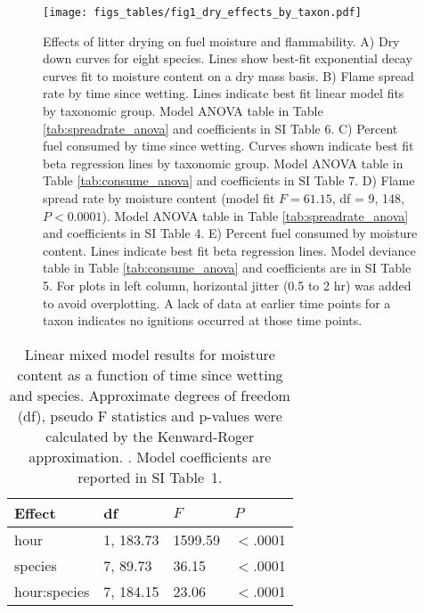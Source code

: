 \documentclass[letterpaper,12pt]{article}
\begin{document}
\begin{figure}
  \centering
  \texttt{[image: figs\_tables/fig1\_dry\_effects\_by\_taxon.pdf]}
  \caption{}
\end{figure}
\begin{figure}
  \captionsetup{labelformat=adja-page}
  \ContinuedFloat
\caption{Effects of litter drying on fuel moisture and flammability. A) Dry
  down curves for eight species. Lines show best-fit exponential decay curves
  fit to moisture content on a dry mass basis. B) Flame spread rate by time
  since wetting. Lines indicate best fit linear model fits by taxonomic group.
  Model ANOVA table in Table \ref{tab:spreadrate_anova} and coefficients in SI
  Table 6. C) Percent fuel consumed by time since wetting. Curves shown
  indicate best fit beta regression lines by taxonomic group. Model ANOVA table
  in Table \ref{tab:consume_anova} and coefficients in SI Table 7.
  D) Flame spread rate by moisture content (model fit $F = 61.15$, df = 9, 148,
  $P < 0.0001$). Model ANOVA table in Table \ref{tab:spreadrate_anova} and
  coefficients in SI Table 4. E) Percent fuel consumed by moisture content.
  Lines indicate best fit beta regression lines. Model deviance table in Table
  \ref{tab:consume_anova} and coefficients are in SI Table 5. For plots in left
  column, horizontal jitter (0.5 to 2 hr) was added to avoid overplotting. A
  lack of data at earlier time points for a taxon indicates no ignitions
  occurred at those time points.}
 \label{fig:drydown}
\end{figure}


\begin{table}
  \caption{Linear mixed model results for moisture content as a function of
    time since wetting and species. Approximate degrees of freedom (df), pseudo F
    statistics and p-values were calculated by the Kenward-Roger approximation.
    \citep{Kenward_Roger-1997}. Model coefficients are reported in SI Table~1.
  \label{tab:drydown}}
\centering
\begin{tabular}{llll}
  \toprule
Effect & df & $F$ & $P$ \\ 
  \midrule
  hour & 1, 183.73 & 1599.59 & $<$.0001 \\ 
  species & 7, 89.73 & 36.15 & $<$.0001 \\ 
  hour:species & 7, 184.15 & 23.06 & $<$.0001 \\ 
   \bottomrule
\end{tabular}
\end{table}
\end{document}
